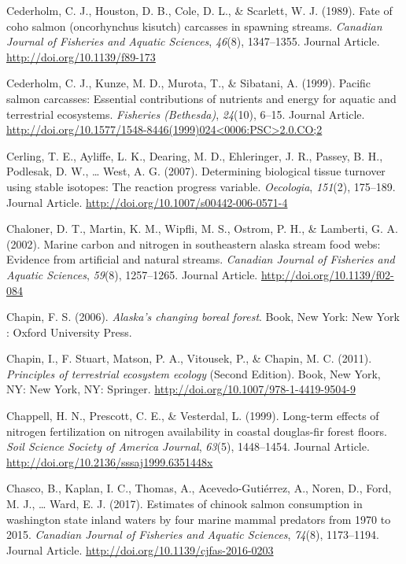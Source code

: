 \documentclass [11pt, proquest] {uwthesis}[2015/03/03]
\begin{document}
\hypertarget{ref-Cederholm1989}{}
Cederholm, C. J., Houston, D. B., Cole, D. L., \& Scarlett, W. J.
(1989). Fate of coho salmon (oncorhynchus kisutch) carcasses in spawning
streams. \emph{Canadian Journal of Fisheries and Aquatic Sciences},
\emph{46}(8), 1347--1355. Journal Article.
\url{http://doi.org/10.1139/f89-173}

\hypertarget{ref-Cederholm1999}{}
Cederholm, C. J., Kunze, M. D., Murota, T., \& Sibatani, A. (1999).
Pacific salmon carcasses: Essential contributions of nutrients and
energy for aquatic and terrestrial ecosystems. \emph{Fisheries
(Bethesda)}, \emph{24}(10), 6--15. Journal Article.
\href{http://doi.org/10.1577/1548-8446(1999)024\%3C0006:PSC\%3E2.0.CO;2}{http://doi.org/10.1577/1548-8446(1999)024\textless{}0006:PSC\textgreater{}2.0.CO;2}

\hypertarget{ref-Cerling2007}{}
Cerling, T. E., Ayliffe, L. K., Dearing, M. D., Ehleringer, J. R.,
Passey, B. H., Podlesak, D. W., \ldots{} West, A. G. (2007). Determining
biological tissue turnover using stable isotopes: The reaction progress
variable. \emph{Oecologia}, \emph{151}(2), 175--189. Journal Article.
\url{http://doi.org/10.1007/s00442-006-0571-4}

\hypertarget{ref-Chaloner2002}{}
Chaloner, D. T., Martin, K. M., Wipfli, M. S., Ostrom, P. H., \&
Lamberti, G. A. (2002). Marine carbon and nitrogen in southeastern
alaska stream food webs: Evidence from artificial and natural streams.
\emph{Canadian Journal of Fisheries and Aquatic Sciences}, \emph{59}(8),
1257--1265. Journal Article. \url{http://doi.org/10.1139/f02-084}

\hypertarget{ref-Chapin2006}{}
Chapin, F. S. (2006). \emph{Alaska's changing boreal forest}. Book, New
York: New York : Oxford University Press.

\hypertarget{ref-Chapin2011}{}
Chapin, I., F. Stuart, Matson, P. A., Vitousek, P., \& Chapin, M. C.
(2011). \emph{Principles of terrestrial ecosystem ecology} (Second
Edition). Book, New York, NY: New York, NY: Springer.
\url{http://doi.org/10.1007/978-1-4419-9504-9}

\hypertarget{ref-Chapell1999}{}
Chappell, H. N., Prescott, C. E., \& Vesterdal, L. (1999). Long-term
effects of nitrogen fertilization on nitrogen availability in coastal
douglas-fir forest floors. \emph{Soil Science Society of America
Journal}, \emph{63}(5), 1448--1454. Journal Article.
\url{http://doi.org/10.2136/sssaj1999.6351448x}

\hypertarget{ref-Chasco2017}{}
Chasco, B., Kaplan, I. C., Thomas, A., Acevedo-Gutiérrez, A., Noren, D.,
Ford, M. J., \ldots{} Ward, E. J. (2017). Estimates of chinook salmon
consumption in washington state inland waters by four marine mammal
predators from 1970 to 2015. \emph{Canadian Journal of Fisheries and
Aquatic Sciences}, \emph{74}(8), 1173--1194. Journal Article.
\url{http://doi.org/10.1139/cjfas-2016-0203}
\end{document}
